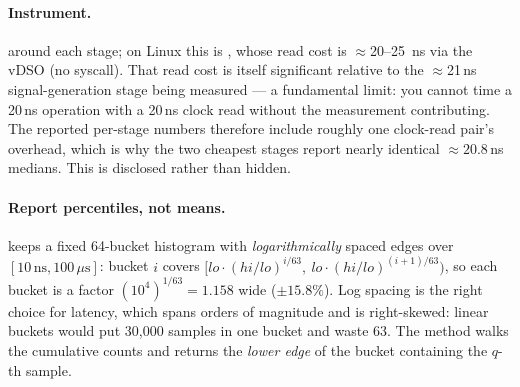 \paragraph{Instrument.}  around each stage; on
Linux this is , whose read cost is $\approx$20--25
\,ns via the vDSO (no syscall). That read cost is itself significant relative to the
$\approx$21\,ns signal-generation stage being measured --- a fundamental limit: you
cannot time a 20\,ns operation with a 20\,ns clock read without the measurement
contributing. The reported per-stage numbers therefore include roughly one clock-read
pair's overhead, which is why the two cheapest stages report nearly identical
$\approx20.8$\,ns medians. This is disclosed rather than hidden.

\paragraph{Report percentiles, not means.}  keeps a
fixed 64-bucket histogram with \emph{logarithmically} spaced edges over
$[10\,\text{ns},100\,\mu\text{s}]$: bucket $i$ covers
$[lo\cdot(hi/lo)^{i/63},\ lo\cdot(hi/lo)^{(i+1)/63})$, so each bucket is a factor
$(10^{4})^{1/63}=1.158$ wide ($\pm15.8\%$). Log spacing is the right choice for latency,
which spans orders of magnitude and is right-skewed: linear buckets would put 30{,}000
samples in one bucket and waste 63. The  method walks the cumulative
counts and returns the \emph{lower edge} of the bucket containing the $q$-th sample.

